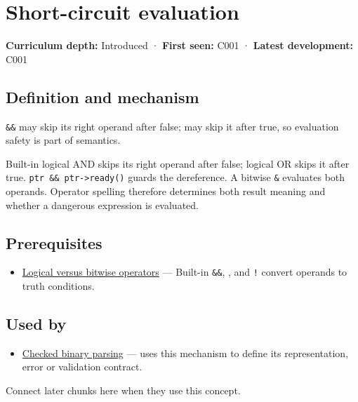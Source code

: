 \hypertarget{appendix-2e245a6fa8d3}{}
\section{Short-circuit evaluation}\label{appendix-2e245a6fa8d3-short-circuit-evaluation}

\textbf{Curriculum depth:} Introduced · \textbf{First seen:} C001 · \textbf{Latest development:} C001

\subsection{Definition and mechanism}\label{appendix-2e245a6fa8d3-definition-and-mechanism}

\texttt{\&\&} may skip its right operand after false; \texttt{\textbar{}\textbar{}} may skip it after true, so evaluation safety is part of semantics.

Built-in logical AND skips its right operand after false; logical OR skips it after true. \texttt{ptr\ \&\&\ ptr-\textgreater{}ready()} guards the dereference. A bitwise \texttt{\&} evaluates both operands. Operator spelling therefore determines both result meaning and whether a dangerous expression is evaluated.

\subsection{Prerequisites}\label{appendix-2e245a6fa8d3-prerequisites}

\begin{itemize}
\tightlist
\item
  \hyperref[appendix-fe6b457d68d8]{Logical versus bitwise operators} --- Built-in \texttt{\&\&}, \texttt{\textbar{}\textbar{}}, and \texttt{!} convert operands to truth conditions.
\end{itemize}

\subsection{Used by}\label{appendix-2e245a6fa8d3-used-by}

\begin{itemize}
\tightlist
\item
  \hyperref[appendix-652d81568de9]{Checked binary parsing} --- uses this mechanism to define its representation, error or validation contract.
\end{itemize}

Connect later chunks here when they use this concept.

